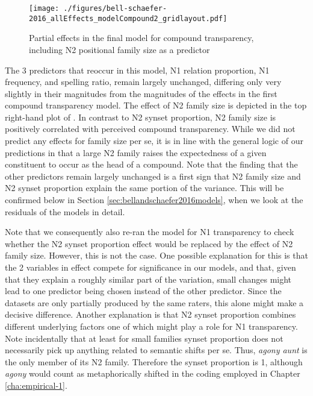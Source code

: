 \begin{figure}[htb]
  \centering
\texttt{[image: ./figures/bell-schaefer-2016\_allEffects\_modelCompound2\_gridlayout.pdf]}
  \caption{Partial effects in the final model for compound transparency, including N2 positional family size as a predictor}
\label{fig:bellschaefer2016_model_compound-family-size}
\end{figure}

The 3 predictors that reoccur in this model, N1 relation proportion,
N1 frequency, and spelling ratio, remain largely unchanged, differing
only very slightly in their magnitudes from the magnitudes of the
effects in the first compound transparency model. The effect of N2
family size is depicted in the top right-hand plot of 
. In contrast to
N2 synset proportion, N2 family size is positively correlated with
perceived compound transparency. While we did not predict any effects
for family size per se, it is in line with the general logic of our
predictions in that a large N2 family raises the expectedness of a given
constituent to occur as the head of a compound. Note that the finding
that the other predictors remain largely unchanged is a first sign
that N2 family size and N2 synset proportion explain the same portion
of the variance. This will be confirmed below in Section
\ref{sec:bellandschaefer2016models}, when we look at the residuals of
the models in detail.

Note that we consequently also re-ran the model for N1 transparency
to check whether the N2 synset proportion effect would be replaced by
the effect of N2 family size. However, this is not the case. One
possible explanation for this is that the 2 variables in effect
compete for significance in our models, and that, given that they
explain a roughly similar part of the variation, small changes
might lead to one predictor being chosen instead of the other predictor. Since
the datasets are only partially produced by the same raters, this
alone might make a decisive difference. Another explanation is
that N2 synset proportion combines different underlying factors one of
which might play a role for N1 transparency. Note incidentally that at
least for small families synset proportion does not necessarily pick up anything
related to semantic shifts per se. Thus, \emph{agony aunt} is the only
member of its N2 family. Therefore the synset proportion is 1, although
\emph{agony} would count as metaphorically shifted in the coding
employed in Chapter \ref{cha:empirical-1}.


